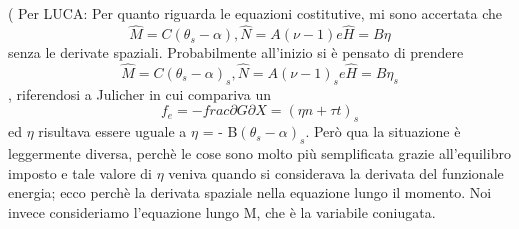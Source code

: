 \documentclass{article}
\begin{document}
\\\\\\\\
( Per LUCA: Per quanto riguarda le equazioni costitutive, mi sono accertata che 
\[ \hat{M} = C(\theta_s -\alpha), \hat{N} = A(\nu - 1) e \hat{H} = B\eta \]
senza le derivate spaziali. Probabilmente all'inizio si è pensato di prendere 
\[ \hat{M} = C(\theta_s -\alpha)_s, \hat{N} = A(\nu - 1)_s e \hat{H} = B\eta _s \]
, riferendosi a Julicher in cui compariva un 
\[ f_e = - frac{\partial G}{\partial X} =(\eta n + \tau t)_s \]
ed $\eta$ risultava essere uguale a $\eta$ = - B$(\theta_s - \alpha)_s$. Però qua la situazione è leggermente diversa, perchè le cose sono molto più semplificata grazie all'equilibro imposto e tale valore di $\eta$ veniva quando si considerava la derivata del funzionale energia; ecco perchè la derivata spaziale nella equazione lungo il momento.
Noi invece consideriamo l'equazione lungo M, che è la variabile coniugata. 
\end{document}
